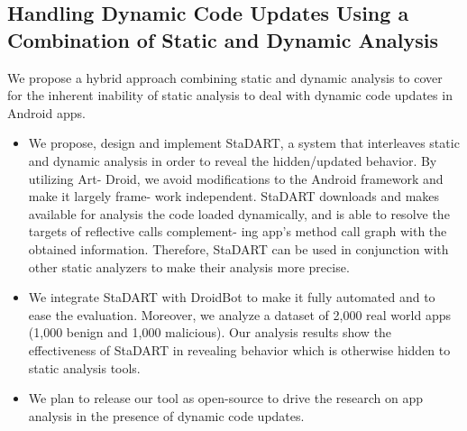 \subsection{Handling Dynamic Code Updates Using a Combination of Static and Dynamic Analysis}

We propose a hybrid approach combining static and dynamic analysis to cover for the inherent inability of static analysis to deal with dynamic code updates in Android apps.
\begin{itemize}
\item We propose, design and implement StaDART, a system that interleaves static and dynamic analysis in order to reveal the hidden/updated behavior. By utilizing Art- Droid, we avoid modifications to the Android framework and make it largely frame- work independent. StaDART downloads and makes available for analysis the code loaded dynamically, and is able to resolve the targets of reflective calls complement- ing app’s method call graph with the obtained information. Therefore, StaDART can be used in conjunction with other static analyzers to make their analysis more precise.
\item We integrate StaDART with DroidBot to make it fully automated and to ease the evaluation. Moreover, we analyze a dataset of 2,000 real world apps (1,000 benign and 1,000 malicious). Our analysis results show the effectiveness of StaDART in revealing behavior which is otherwise hidden to static analysis tools.
\item We plan to release our tool as open-source to drive the research on app analysis in the presence of dynamic code updates.
\end{itemize}


